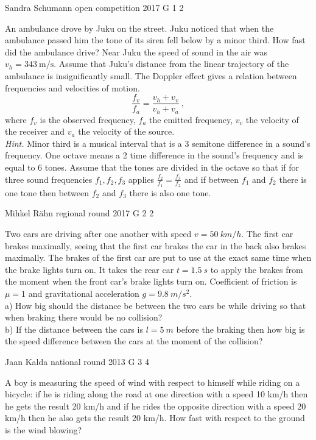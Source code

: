 \documentclass[11pt]{article}
\begin{document}
{Sandra Schumann} %
{open competition} %
{2017} %
{G 1} %
{2} %
{

\ifEngStatement
An ambulance drove by Juku on the street. Juku noticed that when the ambulance passed him the tone of its siren fell below by a minor third. How fast did the ambulance drive? Near Juku the speed of sound in the air was $v_h = \SI{343}{\meter\per\second}$. Assume that Juku’s distance from the linear trajectory of the ambulance is insignificantly small. The Doppler effect gives a relation between frequencies and velocities of motion.
\[ \frac{f_v}{f_a} = \frac{v_h + v_v}{v_h + v_a} \ , \] 
where \(f_v\) is the observed frequency, \(f_a\) the emitted frequency, \(v_v\) the velocity of the receiver and \(v_a\) the velocity of the source. \\
\emph{Hint.} Minor third is a musical interval that is a 3 semitone difference in a sound’s frequency. One octave means a 2 time difference in the sound’s frequency and is equal to 6 tones. Assume that the tones are divided in the octave so that if for three sound frequencies $f_1, f_2, f_3$ applies $\frac{f_2}{f_1} = \frac{f_3}{f_2}$ and if between $f_1$ and $f_2$ there is one tone then between $f_2$ and $f_3$ there is also one tone.
\fi
}

{Mihkel Rähn} %
{regional round} %
{2017} %
{G 2} %
{2} %
{

\ifEngStatement
Two cars are driving after one another with speed $v=\SI{50}{km/h}$. The first car brakes maximally, seeing that the first car brakes the car in the back also brakes maximally. The brakes of the first car are put to use at the exact same time when the brake lights turn on. It takes the rear car $t=\SI{1,5}{s}$ to apply the brakes from the moment when the front car’s brake lights turn on. Coefficient of friction is $\mu=1$ and gravitational acceleration $g=\SI{9,8}{m/s^2}$.\\
a) How big should the distance be between the two cars be while driving so that when braking there would be no collision?\\
b) If the distance between the cars is $l=\SI{5}{m}$ before the braking then how big is the speed difference between the cars at the moment of the collision?
\fi
}

{Jaan Kalda} %
{national round} %
{2013} %
{G 3} %
{4} %
{

\ifEngStatement
A boy is measuring the speed of wind with respect to himself while riding on a bicycle: if he is riding along the road at one direction with a speed 10 km/h then he gets the result 20 km/h and if he rides the opposite direction with a speed 20 km/h then he also gets the result 20 km/h. How fast with respect to the ground is the wind blowing?
\fi
}
\end{document}
